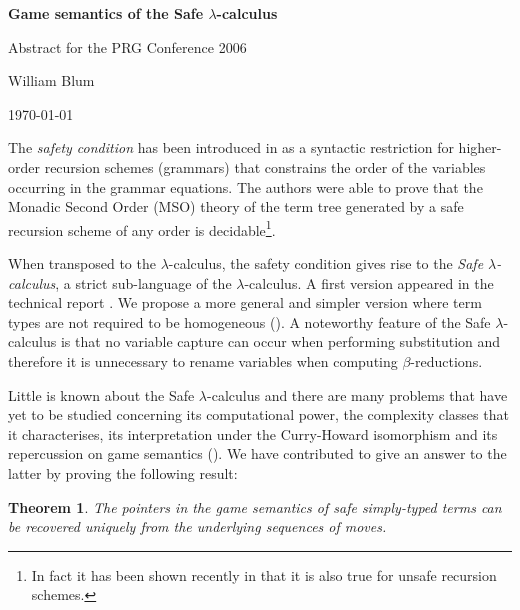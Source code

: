 \documentclass[12pt]{article}
\newtheorem{thm}{Theorem}
\begin{document}
\begin{center}
{\Large \bf Game semantics of the Safe $\lambda$-calculus}
\vspace{0.2cm}

{\small Abstract for the PRG Conference 2006} \vspace{0.4cm}

William Blum \vspace{0.4cm}

\today \vspace{0.5cm}
\end{center}


The \emph{safety condition} has been introduced in \cite{KNU02} as a
syntactic restriction for higher-order recursion schemes (grammars)
that constrains the order of the variables occurring in the grammar
equations. The authors were able to prove that the Monadic Second
Order (MSO) theory of the term tree generated by a safe recursion
scheme of any order is decidable\footnote{In fact it has been shown
recently in \cite{OngLics2006} that it is also true for unsafe
recursion schemes.}.

When transposed to the $\lambda$-calculus, the safety condition
gives rise to the \emph{Safe $\lambda$-calculus}, a strict
sub-language of the $\lambda$-calculus. A first version appeared in
the technical report \cite{safety-mirlong2004}. We propose a more
general and simpler version where term types are not required to be
homogeneous (\cite{blumtransfer}). A noteworthy feature of the Safe
$\lambda$-calculus is that no variable capture can occur when
performing substitution and therefore it is unnecessary to rename
variables when computing $\beta$-reductions.

Little is known about the Safe $\lambda$-calculus and there are many
 problems that have yet to be studied concerning its
computational power, the complexity classes that it characterises,
its interpretation under the Curry-Howard isomorphism and its
repercussion on game semantics
(\cite{abramsky:game-semantics-tutorial}). We have contributed to
give an answer to the latter by proving the following result:
\begin{thm}
\label{thm:safeptrrecover} The pointers in the game semantics of
safe simply-typed terms can be recovered uniquely from the
underlying sequences of moves.
\end{thm}
\end{document}
